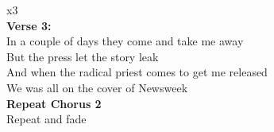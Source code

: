 \\
\\
\\
\\
\\
 x3\\
\textbf{Verse 3:}\\
In a couple of days they come and take me away \\
But the press let the story leak\\
And when the radical priest comes to get me released\\
We was all on the cover of Newsweek\\
\textbf{Repeat Chorus 2}\\
 Repeat and fade

